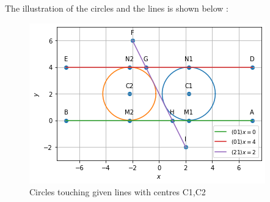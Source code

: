 \documentclass{beamer}
\begin{document}
\begin{frame}
\frametitle{}
The illustration of the circles and the lines is shown below :
\begin{figure}[!ht]
       \centering
    \includegraphics[width=0.8\columnwidth] {Assignment_3_Fig_1.png}
    \caption{Circles touching given lines with centres C1,C2}
    \label{Tangent circles to 3 given lines}
\end{figure}
\end{frame}
\end{document}
